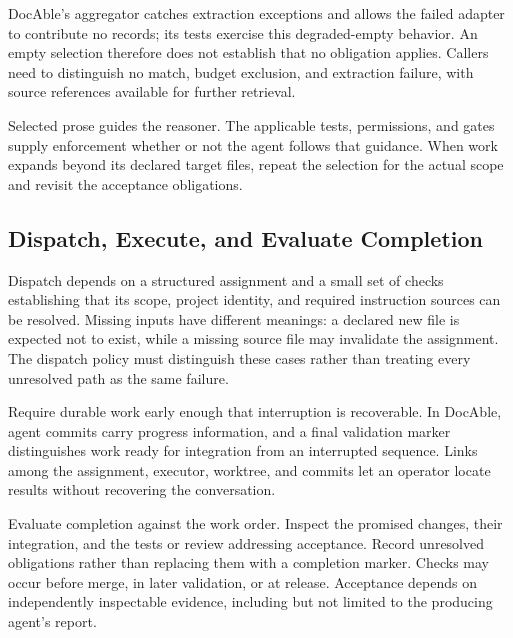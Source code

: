 DocAble's aggregator catches extraction exceptions and allows the failed adapter to contribute no records; its tests exercise this degraded-empty behavior. An empty selection therefore does not establish that no obligation applies. Callers need to distinguish no match, budget exclusion, and extraction failure, with source references available for further retrieval.

Selected prose guides the reasoner. The applicable tests, permissions, and gates supply enforcement whether or not the agent follows that guidance. When work expands beyond its declared target files, repeat the selection for the actual scope and revisit the acceptance obligations.

\subsection*{Dispatch, Execute, and Evaluate Completion}

\label{heading:handbook-model-lifecycle}

Dispatch depends on a structured assignment and a small set of checks establishing that its scope, project identity, and required instruction sources can be resolved. Missing inputs have different meanings: a declared new file is expected not to exist, while a missing source file may invalidate the assignment. The dispatch policy must distinguish these cases rather than treating every unresolved path as the same failure.

Require durable work early enough that interruption is recoverable. In DocAble, agent commits carry progress information, and a final validation marker distinguishes work ready for integration from an interrupted sequence. Links among the assignment, executor, worktree, and commits let an operator locate results without recovering the conversation.

Evaluate completion against the work order. Inspect the promised changes, their integration, and the tests or review addressing acceptance. Record unresolved obligations rather than replacing them with a completion marker. Checks may occur before merge, in later validation, or at release. Acceptance depends on independently inspectable evidence, including but not limited to the producing agent's report.

